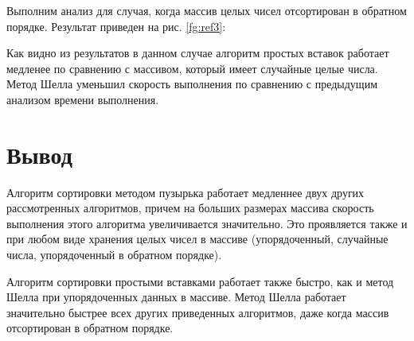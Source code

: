 Выполним анализ для случая, когда массив целых чисел отсортирован в обратном порядке. Результат приведен на рис.
\ref{fg:ref3}:
\begin{figure}[H]
\end{figure} 

Как видно из результатов в данном случае алгоритм простых вставок работает медленее по сравнению с массивом, который имеет случайные целые числа. Метод Шелла уменьшил скорость выполнения по сравнению с предыдущим анализом времени выполнения. 

\section*{Вывод}
Алгоритм сортировки методом пузырька работает медленнее двух других рассмотренных алгоритмов, причем на больших размерах массива скорость выполнения этого алгоритма увеличивается значительно. Это проявляется также и при любом виде хранения целых чисел в массиве (упорядоченный, случайные числа, упорядоченный в обратном порядке).

Алгоритм сортировки простыми вставками работает также быстро, как и метод Шелла при упорядоченных данных в массиве. Метод Шелла работает значительно быстрее всех других приведенных алгоритмов, даже когда массив отсортирован в обратном порядке.